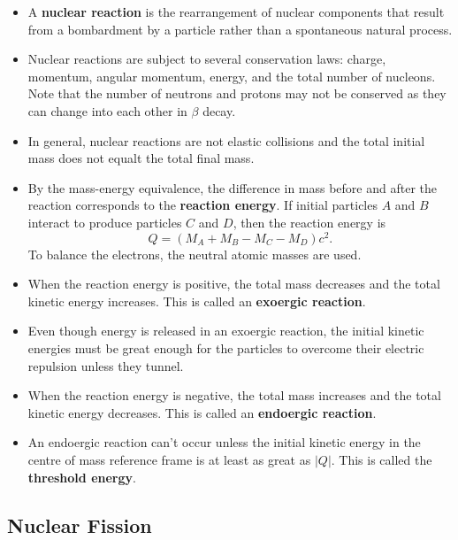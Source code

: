 \documentclass{article}
\begin{document}
\begin{itemize}
  \item A \textbf{nuclear reaction} is the rearrangement of nuclear components that result from a bombardment by a particle rather than a spontaneous natural process.

  \item Nuclear reactions are subject to several conservation laws: charge, momentum, angular momentum, energy, and the total number of nucleons. Note that the number of neutrons and protons may not be conserved as they can change into each other in $\beta$ decay.

  \item In general, nuclear reactions are not elastic collisions and the total initial mass does not equalt the total final mass.

  \item By the mass-energy equivalence, the difference in mass before and after the reaction corresponds to the \textbf{reaction energy}. If initial particles $A$ and $B$ interact to produce particles $C$ and $D$, then the reaction energy is \[Q = (M_A + M_B - M_C - M_D) c^2.\] To balance the electrons, the neutral atomic masses are used.

  \item When the reaction energy is positive, the total mass decreases and the total kinetic energy increases. This is called an \textbf{exoergic reaction}.

  \item Even though energy is released in an exoergic reaction, the initial kinetic energies must be great enough for the particles to overcome their electric repulsion unless they tunnel.

  \item When the reaction energy is negative, the total mass increases and the total kinetic energy decreases. This is called an \textbf{endoergic reaction}.

  \item An endoergic reaction can't occur unless the initial kinetic energy in the centre of mass reference frame is at least as great as $|Q|$. This is called the \textbf{threshold energy}.
\end{itemize}

\subsection{Nuclear Fission}
\end{document}
